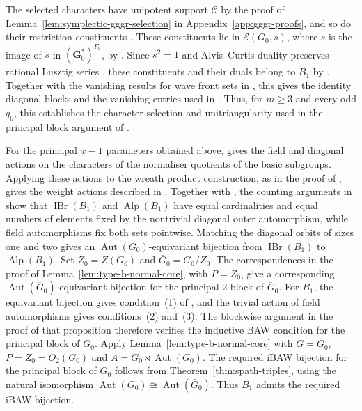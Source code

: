 \documentclass[10pt]{amsart}
\theoremstyle{definition}
\renewcommand{\geq}{\geqslant}
\let\oldendproof\endproof
\renewenvironment{proof}[1][\proofname]{%
  \oldproof[\bfseries #1]%
}{\oldendproof}
\DeclareMathOperator{\Aut}{Aut}
\DeclareMathOperator{\IBr}{IBr}
\DeclareMathOperator{\Alp}{Alp}
\numberwithin{equation}{section}
\numberwithin{table}{section}
\begin{document}
\begin{proof}
The selected characters have unipotent support $\mathcal C$ by the
proof of Lemma~\ref{lem:symplectic-gggr-selection} in
Appendix~\ref{app:gggr-proofs}, and so do their restriction constituents \cite[Example~2.7.18]{GeckMalle2020}.
These constituents lie in $\mathcal E(G_0,s)$, where $s$ is the
image of $\widetilde s$ in $(\mathbf G_0^*)^{F_0}$, by
\cite[Proposition~2.6.16]{GeckMalle2020}.
Since $s^2=1$ and Alvis--Curtis duality preserves rational Lusztig
series \cite[Proposition~9.8(iv)]{CabanesEnguehard2004}, these
constituents and their duals belong to $B_1$ by
\cite[Theorem~21.14]{CabanesEnguehard2004}.
Together with the vanishing results for wave front sets in
\cite[Lemma~14.15 and Proposition~15.2]{Taylor2016}, this gives
the identity diagonal blocks and the vanishing entries used in
\cite[Theorem~2.9]{Chaneb2021}.
Thus, for $m\geq3$ and every odd $q_0$, this establishes the
character selection and unitriangularity used in the principal
block argument of \cite[Section~4.1]{FengMalle2022}.

For the principal $x-1$ parameters obtained above,
\cite[Lemma~5.1]{FengMalle2022} gives the field and diagonal actions on
the characters of the normaliser quotients of the basic subgroups. Applying these actions
to the wreath product construction, as in the proof of
\cite[Proposition~5.5]{FengMalle2022}, gives the weight actions described
in \cite[Proposition~5.9]{FengMalle2022}.
Together with \cite[Corollary~4.3]{FengMalle2022}, the counting arguments in
\cite[Proposition~6.1 and the proof of Theorem~6.2]{FengMalle2022} show that
$\IBr(B_1)$ and $\Alp(B_1)$ have equal cardinalities and equal numbers of
elements fixed by the nontrivial diagonal outer automorphism, while field
automorphisms fix both sets pointwise.  Matching the diagonal orbits of
sizes one and two gives an $\Aut(G_0)$-equivariant bijection from
$\IBr(B_1)$ to $\Alp(B_1)$.
Set $Z_0=Z(G_0)$ and $\overline G_0=G_0/Z_0$.
The correspondences in the proof of Lemma~\ref{lem:type-b-normal-core},
with $P=Z_0$, give a corresponding
$\Aut(\overline G_0)$-equivariant bijection for the principal
$2$-block of $\overline G_0$.
For $B_1$, the equivariant bijection gives condition~(1) of
\cite[Proposition~3.4]{FengMalle2022}, and the trivial action of field
automorphisms gives conditions~(2) and~(3).  The blockwise argument in the
proof of that proposition therefore verifies the inductive BAW condition
for the principal block of $\overline G_0$.
Apply Lemma~\ref{lem:type-b-normal-core} with
$G=G_0$, $P=Z_0=O_2(G_0)$ and $A=G_0\rtimes\Aut(G_0)$.
The required iBAW bijection for the principal block of $\overline G_0$ follows
from Theorem~\ref{thm:spath-triples}, using the natural isomorphism
$\Aut(G_0)\cong\Aut(\overline G_0)$.
Thus $B_1$ admits the required iBAW bijection.


\end{proof}
\end{document}
